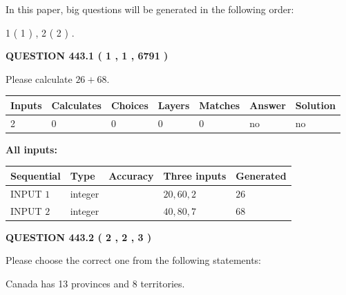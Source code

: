 \documentclass[12pt]{article}
\begin{document}
In this paper, big questions will be generated in the following order: 
   
   
   1 ( 1 )
 ,
   2 ( 2 )
 .
  
\vspace{0.2in}
  
{\textbf{\Large{QUESTION
443.1 
 ( 1 , 1 , 6791 )
}}}
  
  
 
Please calculate $ %
26 +  %
68 $.
 
 
   
   
   
   
\noindent\begin{tabular}{|l|l|l|l|l|l|l|}
 \hline
Inputs & Calculates & Choices & Layers & Matches & Answer & Solution \\ \hline
 2  & 
 0  & 
 0
  & 
 0  & 
 0  & 
  no & 
  no 
  \\ \hline
 \end{tabular}
   
   
   
   
\noindent{}
   
   
   
   
\noindent\vspace{0.1in}\hspace{-0.08in} {\textbf{\Large{All inputs: }}}
   
   
  
  
\noindent\begin{tabular}{|l|l|l|l|l|}
\hline
 Sequential & Type & Accuracy & Three inputs & Generated \\ 
\hline
 
 
  INPUT $  1 $ & integer &  & $
 20
 , 
 60
 , 
 2
 $ & $ 26 $ 
 \\  \hline  
 
 
  INPUT $  2 $ & integer &  & $
 40
 , 
 80
 , 
 7
 $ & $ 68 $ 
 \\  \hline  
 \end{tabular}
   
   
  
\vspace{0.2in}
  
{\textbf{\Large{QUESTION
443.2 
 ( 2 , 2 , 3 )
}}}
  
  
Please choose the correct one from the following statements:
 
 
Canada has  13 provinces and  8 territories.
 
\end{document}
